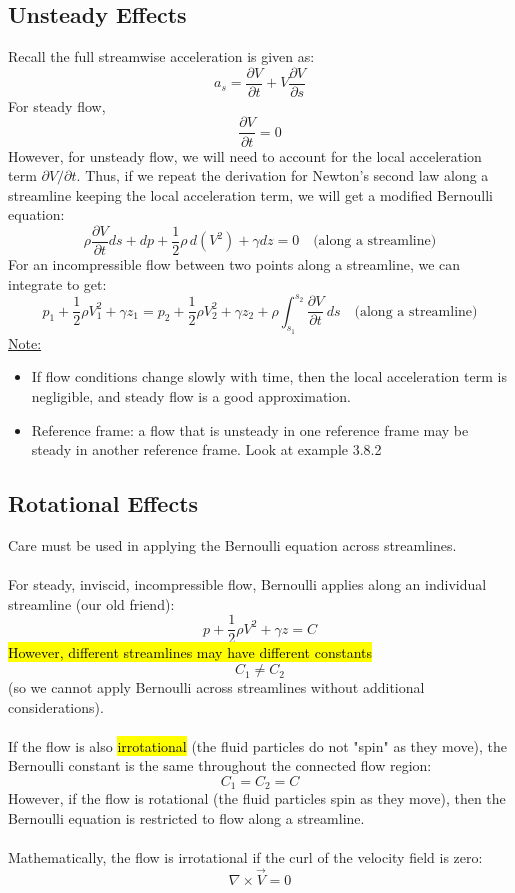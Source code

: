 ﻿\documentclass[12pt]{article}
\begin{document}
\subsection*{Unsteady Effects}
Recall the full streamwise acceleration is given as:
\[a_s = \frac{\partial V}{\partial t} + V \frac{\partial V}{\partial s}\]
For steady flow,
\[\frac{\partial V}{\partial t} = 0\]
However, for unsteady flow, we will need to account for the local acceleration term $\partial V/\partial t$. Thus, if we repeat the derivation for Newton's second law along a streamline keeping the local acceleration term, we will get a modified Bernoulli equation:
\[\rho \frac{\partial V}{\partial t} ds + dp+\frac{1}{2}\rho\,d(V^2)+ \gamma dz = 0 \quad \text{(along a streamline)}\]
For an incompressible flow between two points along a streamline, we can integrate to get:
\[p_1 + \frac{1}{2}\rho V_1^2 + \gamma z_1 = p_2 + \frac{1}{2} \rho V_2^2 + \gamma z_2+ \rho \int_{s_1}^{s_2} \frac{\partial V}{\partial t} \,ds  \quad \text{(along a streamline)}\]
\underline{Note:} 
\begin{itemize}
    \item If flow conditions change slowly with time, then the local acceleration term is negligible, and steady flow is a good approximation.
    \item Reference frame: a flow that is unsteady in one reference frame may be steady in another reference frame. Look at example 3.8.2 
\end{itemize}
\subsection*{Rotational Effects}
Care must be used in applying the Bernoulli equation across streamlines.\\\\
For steady, inviscid, incompressible flow, Bernoulli applies along an individual streamline (our old friend):
\[p + \frac{1}{2}\rho V^2 + \gamma z = C\]
\hl{However, different streamlines may have different constants}
\[C_1 \neq C_2\]
(so we cannot apply Bernoulli across streamlines without additional considerations).\\\\
If the flow is also \hl{irrotational} (the fluid particles do not "spin" as they move), the Bernoulli constant is the same throughout the connected flow region:
\[C_1 = C_2=C\]
However, if the flow is rotational (the fluid particles spin as they move), then the Bernoulli equation is restricted to flow along a streamline.\\\\
Mathematically, the flow is irrotational if the curl of the velocity field is zero:
\[\nabla \times \vec{V} = 0\]
\newpage
\end{document}

